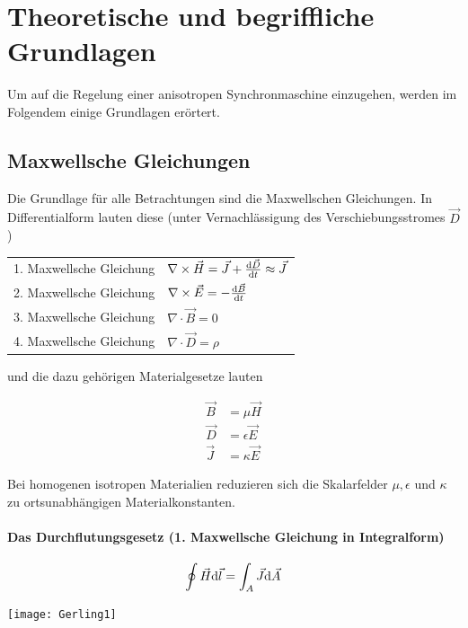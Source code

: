
\chapter{Theoretische und begriffliche Grundlagen}\label{cha:grundlagen}

Um auf die Regelung einer anisotropen Synchronmaschine einzugehen, werden im Folgendem einige Grundlagen erörtert.

\section{Maxwellsche Gleichungen}\label{sec:maxwell}

Die Grundlage für alle Betrachtungen sind die Maxwellschen Gleichungen.
In Differentialform lauten diese (unter Vernachlässigung des Verschiebungsstromes $\vec{D}$)

\begin{tabular}{ll}
1. Maxwellsche Gleichung	&	$\nabla \times \vec{H} = \vec{J}+\frac{\mathrm{d}\vec{D}}{\mathrm{d}t} \approx \vec{J}$ \\
2. Maxwellsche Gleichung	&	$\nabla \times \vec{E} = -\frac{\mathrm{d}\vec{B}}{\mathrm{d}t}$ \\
3. Maxwellsche Gleichung	&	$\nabla \cdot \vec{B} = 0$ \\
4. Maxwellsche Gleichung	&	$\nabla \cdot \vec{D} = \rho$
\end{tabular}

und die dazu gehörigen Materialgesetze lauten

\begin{align*}
\vec{B} &= \mu\vec{H}\\
\vec{D}	&= \epsilon\vec{E}\\
\vec{J} &= \kappa\vec{E}
\end{align*}

Bei homogenen isotropen Materialien reduzieren sich die Skalarfelder $\mu, \epsilon$ und $\kappa$ zu ortsunabhängigen Materialkonstanten.

\subsubsection{Das Durchflutungsgesetz (1. Maxwellsche Gleichung in Integralform)}

\begin{minipage}{0.5\textwidth}
	\begin{align}
		\oint \vec{H}\mathrm{d}\vec{l} = \int_A \vec{J}\mathrm{d}\vec{A}
	\end{align}
\end{minipage}
\begin{minipage}{0.5\textwidth}
	\texttt{[image: Gerling1]}
\end{minipage}

